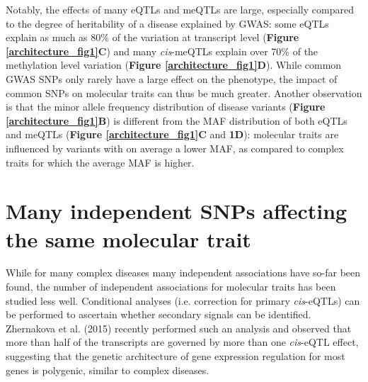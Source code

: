 Notably, the effects of many eQTLs and meQTLs are large, especially compared to the degree of heritability of a disease explained by GWAS: some eQTLs explain as much as 80\% of the variation at transcript level (\textbf{Figure \ref{architecture_fig1}C}) and many \textit{cis}-meQTLs explain over 70\% of the methylation level variation (\textbf{Figure \ref{architecture_fig1}D}). While common GWAS SNPs only rarely have a large effect on the phenotype, the impact of common SNPs on molecular traits can thus be much greater. 
Another observation is that the minor allele frequency distribution of disease variants (\textbf{Figure \ref{architecture_fig1}B}) is different from the MAF distribution of both eQTLs and meQTLs (\textbf{Figure \ref{architecture_fig1}C} and \textbf{1D}): molecular traits are influenced by variants with on average a lower MAF, as compared to complex traits for which the average MAF is higher.

\section{Many independent SNPs affecting the same molecular trait}
While for many complex diseases many independent associations have so-far been found, the number of independent associations for molecular traits has been studied less well. Conditional analyses (i.e. correction for primary \textit{cis}-eQTLs) can be performed to ascertain whether secondary signals can be identified. Zhernakova et al. (2015) recently performed such an analysis and observed that more than half of the transcripts are governed by more than one \textit{cis}-eQTL effect, suggesting that the genetic architecture of gene expression regulation for most genes is polygenic, similar to complex diseases.

